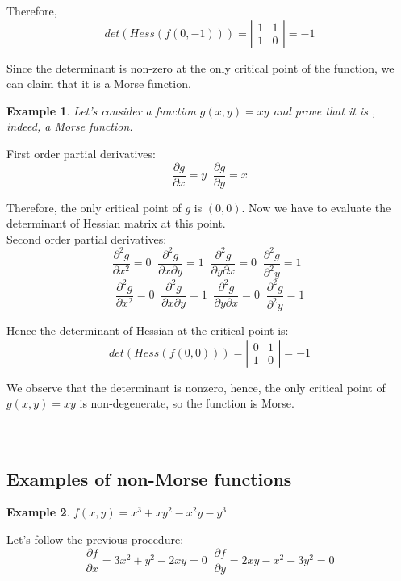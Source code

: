 \documentclass[]{article}
\newtheorem{example}{Example}
\begin{document}
Therefore, 
\begin{equation}
det(Hess(f(0,-1)))=\left| \begin{array}{cc} 1 & 1 \\ 1 & 0 \end{array} \right|=-1
\end{equation}

Since the determinant is non-zero at the only critical point of the function, we can claim that it is a Morse function. \\
\begin{example}
Let's consider a function $g(x,y)=xy$ and prove that it is , indeed, a Morse function.
\end{example}
First order partial derivatives: 
\begin{equation}
\frac{\partial g}{\partial x}=y \;\;
\frac{\partial g}{\partial y}=x 
\end{equation}

Therefore, the only critical point of $g$ is $(0,0)$. Now we have to evaluate the determinant of Hessian matrix at this point.\\
Second order partial derivatives: 
\begin{equation}
\frac{\partial^2 g}{\partial x^2}=0 \;\;
\frac{\partial^2 g}{\partial x \partial y}=1\;\;
\frac{\partial^2 g}{\partial y \partial x}=0\;\;
\frac{\partial^2 g}{\partial^2 y}=1\;\;
\end{equation}
\begin{equation}
\frac{\partial^2 g}{\partial x^2}=0\;\;
\frac{\partial^2 g}{\partial x \partial y}=1\;\;
\frac{\partial^2 g}{\partial y \partial x}=0\;\;
\frac{\partial^2 g}{\partial^2 y}=1
\end{equation}

Hence the determinant of Hessian at the critical point is:
\begin{equation}
det(Hess(f(0,0)))=\left| \begin{array}{cc} 0 & 1 \\ 1 & 0 \end{array} \right|=-1   
\end{equation}

We observe that the determinant is nonzero, hence, the only critical point of $g(x,y)=xy$ is non-degenerate, so the function is Morse. \\
\\
\\
\subsection{Examples of non-Morse functions} 
\begin{example}
$f(x,y)=x^3+xy^2-x^2y-y^3$
\end{example}
Let's follow the previous procedure: 
\begin{equation}
\frac{\partial f}{\partial x}=3x^2+y^2-2xy=0 \;\;
\frac{\partial f}{\partial y}=2xy-x^2-3y^2=0    
\end{equation}
\end{document}
